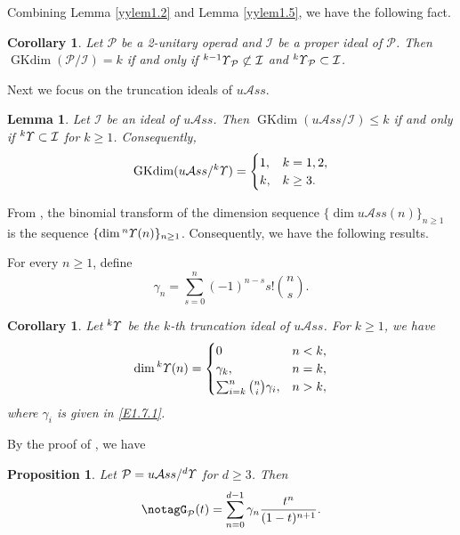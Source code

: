 \documentclass{amsart}
\newtheorem{cor}[thm]{Corollary}
\newtheorem{lem}[thm]{Lemma}
\newtheorem{prop}[thm]{Proposition}
\theoremstyle{definition}
\theoremstyle{remark}
\numberwithin{equation}{section}
\newcommand{\up}[1]{{^{#1}{\it \!\Upsilon}}}
\def \uas{u\mathcal{A}ss}
\def \I{\mathcal{I}}
\def \ip{{\mathcal{P}}}
\def \dim{\operatorname{dim}}
\def\gkdim{\operatorname{GKdim}}
\begin{document}
Combining Lemma \ref{yylem1.2} and Lemma \ref{yylem1.5}, 
we have the following fact.

\begin{cor}
\label{yycor1.6}
Let $\ip$ be a 2-unitary operad and $\I$ be a proper ideal of 
$\ip$. Then $\gkdim(\ip/\I)=k$ if and only if 
$\up{k-1}_\ip\not\subset \I$ and $\up{k}_\ip\subset \I$. 
\end{cor}

Next we focus on the truncation ideals of $\uas$. 

\begin{lem}
\cite[Corollary 5.4]{BYZ}
\label{yylem1.7}
Let $\I$ be an ideal of $\uas$. Then
$\gkdim(\uas/\I)\le k$ if and only if $\up{k}\subset \I$ for 
$k\ge 1$. Consequently, 
\[\gkdim(\uas/\up{k})=\begin{cases}
1, & k=1, 2, \\
k, & k\ge 3.
\end{cases}\]
\end{lem}

From  \cite[Section 5]{BYZ}, the binomial transform 
of the dimension sequence $\{\dim\uas(n)\}_{n\ge 1}$ is the   
sequence $\{\dim\up{n}(n)\}_{n\ge 1}$. Consequently, we have 
the following results.

For every $n\geq 1$, define
\begin{equation}
\label{E1.7.1}\tag{E1.7.1}
\gamma_n=\sum_{s=0}^{n} (-1)^{n-s} s! {n \choose s}.
\end{equation}

\begin{cor}
\label{yycor1.8}
Let $\up{k}$ be the $k$-th truncation ideal of $\uas$.	For 
$k\ge 1$, we have
\[\dim\up{k}(n)=
\begin{cases}
0 & n<k,\\
\gamma_k, & n=k, \\
\sum_{i=k}^n {n\choose i}\gamma_i, & n>k,	
\end{cases}\]
where $\gamma_i$ is given in \eqref{E1.7.1}.
\end{cor}

By the proof of \cite[Theorem 5.3 and Corollary 5.4]{BYZ}, 
we have

\begin{prop}\cite{Sp, BYZ}
\label{yypro1.9}
Let $\ip=\uas/\up{d}$ for $d\geq 3$. Then
\begin{equation}
\notag%
G_{\ip}(t)=\sum_{n=0}^{d-1} 
\gamma_n \frac{t^n}{(1-t)^{n+1}}.
\end{equation}
\end{prop}
\end{document}
